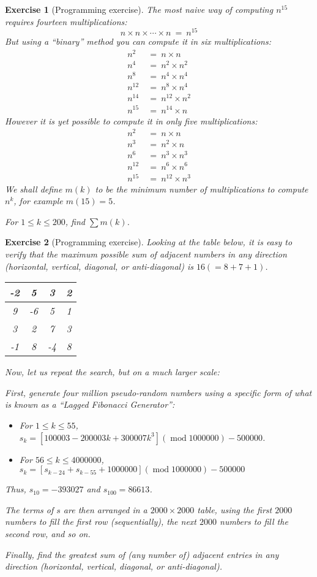\documentclass[11pt]{amsart}
\theoremstyle{theorem}
\newtheorem{exercise}{Exercise}
\newcommand\Mod{\operatorname{mod}}
\begin{document}
\begin{exercise}[Programming exercise]
The most naive way of computing $n^{15}$ requires fourteen multiplications:
\[
n\times n\times \cdots\times n \ = \ n^{15}
\]
But using a ``binary'' method you can compute it in six multiplications:
\begin{align*}
n^2 \ &= \ n\times n \\
n^4 \ &= \ n^2\times n^2 \\
n^8 \ &= \ n^4\times n^4 \\
n^{12} \ &= \ n^8\times n^4 \\
n^{14} \ &= \ n^{12}\times n^2 \\
n^{15} \ &= \ n^{14}\times n
\end{align*}
However it is yet possible to compute it in only five multiplications:
\begin{align*}
n^2 \ &= \ n\times n \\
n^3 \ &= \ n^2\times n \\
n^6 \ &= \ n^3\times n^3 \\
n^{12} \ &= \ n^6\times n^6 \\
n^{15} \ &= \ n^{12}\times n^3
\end{align*}
We shall define $m(k)$ to be the minimum number of multiplications to compute $n^k$, for example $m(15)=5$.

For $1\leq k\leq 200$, find $\sum m(k)$.
\end{exercise}


\begin{exercise}[Programming exercise]
Looking at the table below, it is easy to verify that the maximum possible sum of adjacent numbers in any direction (horizontal, vertical, diagonal, or anti-diagonal) is $16 (=8+7+1)$.
\begin{center}
\begin{tabular}{|c|c|c|c|}
\hline
-2 & 5 & 3 & 2 \\
\hline
9 & -6 & 5 & 1 \\
\hline
3 & 2 & 7 & 3 \\
\hline
-1 & 8 & -4 & 8 \\
\hline
\end{tabular}
\end{center}
Now, let us repeat the search, but on a much larger scale:

First, generate four million pseudo-random numbers using a specific form of what is known as a ``Lagged Fibonacci Generator'':
\begin{itemize}
\item For $1\leq k\leq 55$, $s_k = [100003-200003k+300007k^3](\Mod 1000000)- 500000$.
\item For $56\leq k\leq 4000000$, $s_k = [s_{k-24}+s_{k-55}+1000000](\Mod 1000000)- 500000$
\end{itemize}
Thus, $s_{10}=-393027$ and $s_{100}=86613$.

The terms of $s$ are then arranged in a $2000\times 2000$ table, using the first $2000$ numbers to fill the first row (sequentially), the next $2000$ numbers to fill the second row, and so on.

Finally, find the greatest sum of (any number of) adjacent entries in any direction (horizontal, vertical, diagonal, or anti-diagonal).
\end{exercise}
\end{document}
